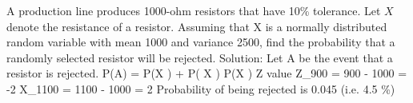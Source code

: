 
A production line produces 1000-ohm resistors that have 10\% tolerance.
Let $X$ denote the resistance of a resistor.
Assuming that X is a normally distributed random variable with mean 1000 and variance 2500, find the probability that a randomly selected resistor will be rejected.
Solution:
Let A be the event that a resistor is rejected.
P(A)  = P(X ) + P( X )
P(X )
Z value
Z_{900} = { 900 - 1000} = -2
X_{1100} = { 1100 - 1000} = 2
Probability of being rejected is 0.045 (i.e. 4.5 \%)

